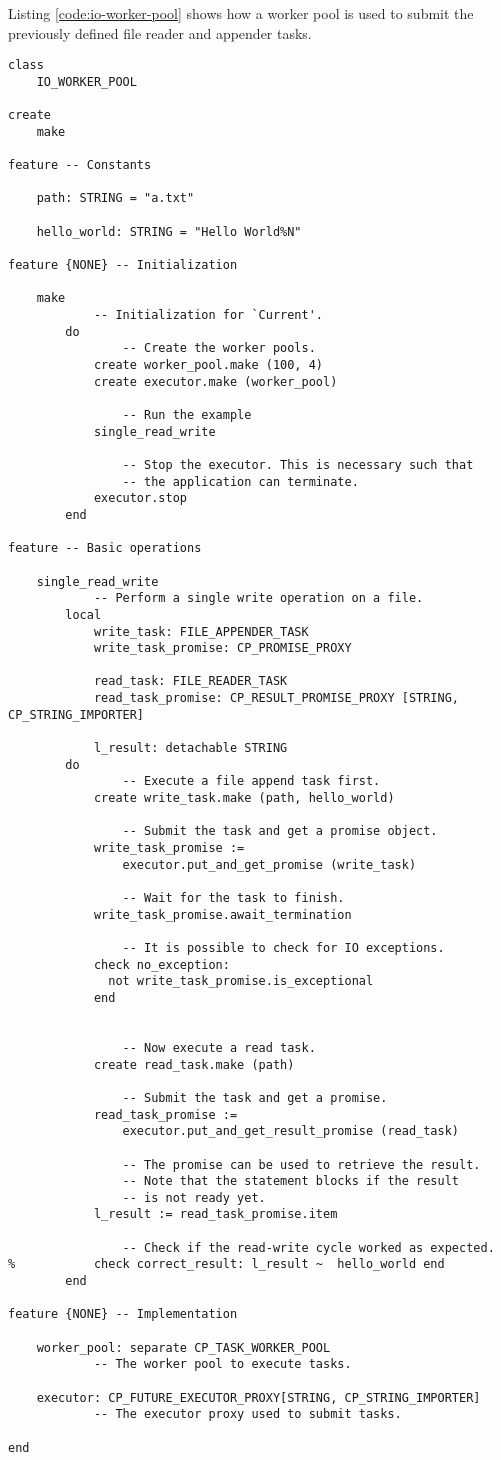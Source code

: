 Listing \ref{code:io-worker-pool} shows how a worker pool is used to submit the previously defined file reader and appender tasks.

\begin{lstlisting}[language=OOSC2Eiffel, label={code:io-worker-pool}, captionpos=b, caption={Using a worker pool for futures and asynchronous tasks.}]
class
	IO_WORKER_POOL

create
	make

feature -- Constants

	path: STRING = "a.txt"
	
	hello_world: STRING = "Hello World%N"

feature {NONE} -- Initialization

	make
			-- Initialization for `Current'.
		do
				-- Create the worker pools.
			create worker_pool.make (100, 4)
			create executor.make (worker_pool)

				-- Run the example
			single_read_write

				-- Stop the executor. This is necessary such that 
				-- the application can terminate.
			executor.stop
		end

feature -- Basic operations

	single_read_write
			-- Perform a single write operation on a file.
		local
			write_task: FILE_APPENDER_TASK
			write_task_promise: CP_PROMISE_PROXY

			read_task: FILE_READER_TASK
			read_task_promise: CP_RESULT_PROMISE_PROXY [STRING, CP_STRING_IMPORTER]

			l_result: detachable STRING
		do
				-- Execute a file append task first.
			create write_task.make (path, hello_world)

				-- Submit the task and get a promise object.
			write_task_promise := 
				executor.put_and_get_promise (write_task)

				-- Wait for the task to finish.
			write_task_promise.await_termination

				-- It is possible to check for IO exceptions.
			check no_exception: 
			  not write_task_promise.is_exceptional 
			end


				-- Now execute a read task.
			create read_task.make (path)

				-- Submit the task and get a promise.
			read_task_promise := 
				executor.put_and_get_result_promise (read_task)

				-- The promise can be used to retrieve the result.
				-- Note that the statement blocks if the result
				-- is not ready yet.
			l_result := read_task_promise.item

				-- Check if the read-write cycle worked as expected.
% 			check correct_result: l_result ~  hello_world end
		end

feature {NONE} -- Implementation

	worker_pool: separate CP_TASK_WORKER_POOL
			-- The worker pool to execute tasks.

	executor: CP_FUTURE_EXECUTOR_PROXY[STRING, CP_STRING_IMPORTER]
			-- The executor proxy used to submit tasks.

end
\end{lstlisting}


